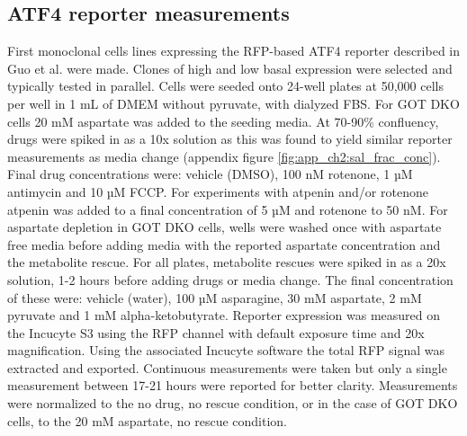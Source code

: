 \subsection{ATF4 reporter measurements}
First monoclonal cells lines expressing the RFP-based ATF4 reporter described in Guo et al. \cite{Guo2020-ia} were made.
Clones of high and low basal expression were selected and typically tested in parallel.
Cells were seeded onto 24-well plates at 50,000 cells per well in 1 mL of DMEM without pyruvate, with dialyzed FBS.
For GOT DKO cells 20 mM aspartate was added to the seeding media.
At 70-90\% confluency, drugs were spiked in as a 10x solution as this was found to yield similar reporter measurements as media change (appendix figure \ref{fig:app_ch2:sal_frac_conc}).
Final drug concentrations were: vehicle (DMSO), 100 nM rotenone, 1 µM antimycin and 10 µM FCCP.
For experiments with atpenin and/or rotenone atpenin was added to a final concentration of 5 µM and rotenone to 50 nM.
For aspartate depletion in GOT DKO cells, wells were washed once with aspartate free media before adding media with the reported aspartate concentration and the metabolite rescue.
For all plates, metabolite rescues were spiked in as a 20x solution, 1-2 hours before adding drugs or media change.
The final concentration of these were: vehicle (water), 100 µM asparagine, 30 mM aspartate, 2 mM pyruvate and 1 mM alpha-ketobutyrate.
Reporter expression was measured on the Incucyte S3 using the RFP channel with default exposure time and 20x magnification.
Using the associated Incucyte software the total RFP signal was extracted and exported.
Continuous measurements were taken but only a single measurement between 17-21 hours were reported for better clarity.
Measurements were normalized to the no drug, no rescue condition, or in the case of GOT DKO cells, to the 20 mM aspartate, no rescue condition.


